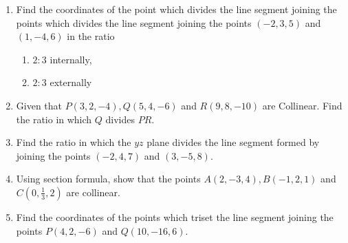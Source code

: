 \begin{enumerate}
\item Find the coordinates of the point which divides the line segment joining the points which divides the line segment joining  the points $(-2,3,5)$ and $(1,-4,6)$ in the ratio 
\begin{enumerate}
\item $2:3$ internally,
\item $2:3$ externally
\end{enumerate}
\item Given that $P(3,2,-4), Q(5,4,-6)$ and $R(9,8,-10)$ are Collinear. Find the ratio in which $Q$ divides $PR$.
\item Find the ratio in which the $yz$ plane divides the line segment formed by joining the points $(-2,4,7)$ and $(3,-5,8)$.
\item Using section formula, show that the points $A(2,-3,4), B(-1,2,1)$ and $C(0,\frac{1}{3},2)$ are collinear.
\item Find the coordinates of the points which triset the line segment joining the points $P(4,2,-6)$ and $Q(10,-16,6)$.
\end{enumerate}

